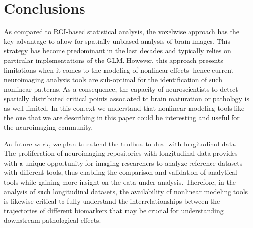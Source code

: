 \documentclass{article}
\begin{document}
\section{Conclusions}

As compared to ROI-based statistical analysis, the voxelwise approach has the key advantage to allow for spatially unbiased analysis of brain images. This strategy has become predominant in the last decades and typically relies on particular implementations of the GLM. However, this approach presents limitations when it comes to the modeling of nonlinear effects, hence current neuroimaging analysis tools are sub-optimal for the identification of such nonlinear patterns. As a consequence, the capacity of neuroscientists to detect spatially distributed critical points associated to brain maturation or pathology is as well limited. In this context we understand that nonlinear modeling tools like the one that we are describing in this paper could be interesting and useful for the neuroimaging community. 

As future work, we plan to extend the toolbox to deal with longitudinal data. The proliferation of neuroimaging repositories with longitudinal data provides with a unique opportunity for imaging researchers to analyze reference datasets with different tools, thus enabling the comparison and validation of analytical tools while gaining more insight on the data under analysis. Therefore, in the analysis of such longitudinal datasets, the availability of nonlinear modeling tools is likewise critical to fully understand the interrelationships between the trajectories of different biomarkers that may be crucial for understanding downstream pathological effects.



\newpage
\small

\nocite{statistics_Hastie_2009}
\nocite{tutorial_SVR}



\end{document}

